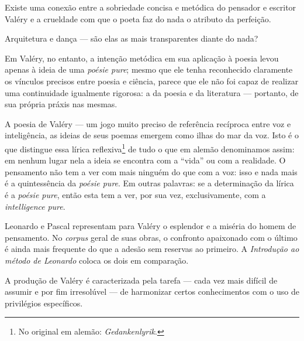 Existe uma conexão entre a sobriedade concisa e metódica do
pensador e escritor Valéry e a crueldade com que o poeta faz do nada o
atributo da perfeição.

Arquitetura e dança --- são elas as mais transparentes diante do nada?

Em Valéry, no entanto, a intenção metódica em sua aplicação à poesia
levou apenas à ideia de uma \emph{poésie pure}; mesmo que ele tenha
reconhecido claramente os vínculos precisos entre poesia e ciência,
parece que ele não foi capaz de realizar uma continuidade igualmente
rigorosa: a da poesia e da literatura --- portanto, de sua própria práxis
nas mesmas.

A poesia de Valéry --- um jogo muito preciso de referência recíproca entre
voz e inteligência, as ideias de seus poemas emergem como ilhas do mar
da voz. Isto é o que distingue essa lírica reflexiva\footnote{No
  original em alemão: \emph{Gedankenlyrik}. \versal{[N.~T.]}} de tudo o que em alemão denominamos
assim: em nenhum lugar nela a ideia se encontra com a ``vida'' ou com a
realidade. O pensamento não tem a ver com mais ninguém do que com a voz:
isso e nada mais é a quintessência da \emph{poésie pure}. Em outras
palavras: se a determinação da lírica é a \emph{poésie pure}, então esta
tem a ver, por sua vez, exclusivamente, com a \emph{intelligence}
\emph{pure}.

Leonardo e Pascal representam para Valéry o esplendor e a miséria do
homem de pensamento. No \emph{corpus} geral de suas obras, o confronto
apaixonado com o último é ainda mais frequente do que a adesão sem
reservas ao primeiro. A \emph{Introdução ao método de Leonardo} coloca os
dois em comparação.

A produção de Valéry é caracterizada pela tarefa --- cada vez mais
difícil de assumir e por fim irresolúvel --- de harmonizar certos
conhecimentos com o uso de privilégios específicos.


\pagebreak
\thispagestyle{empty}